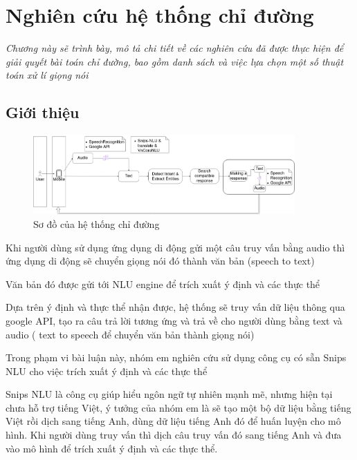 \chapter{Nghiên cứu hệ thống chỉ đường}
\label{Chapter3}

\emph{Chương này sẽ trình bày, mô tả chi tiết về các nghiên cứu đã được thực hiện để giải quyết bài toán chỉ đường, bao gồm danh sách và việc lựa chọn một số thuật toán xử lí giọng nói}

\section{Giới thiệu}
   \begin{figure}[htp]
              \centering
              \includegraphics[width=10cm]{images/Structure-description.png} 
              \caption{Sơ đồ của hệ thống chỉ đường}
              \label{fig:sodohethongchiduong}

          \end{figure}
          
          
Khi người dùng sử dụng ứng dụng di động gửi một câu truy vấn bằng audio thì ứng dụng di động sẽ chuyển giọng nói đó thành văn bản (speech to text)

Văn bản đó được gửi tới NLU engine để trích xuất ý định và các thực thể


Dựa trên ý định và thực thể nhận được, hệ thống sẽ truy vấn dữ liệu thông qua google API, tạo ra câu trả lời tương ứng và trả về cho người dùng bằng text và audio ( text to speech để chuyển văn bản thành giọng nói)



Trong phạm vi bài luận này, nhóm em nghiên cứu sử dụng công cụ có sẵn Snips NLU\cite{Snipsnlu} cho việc trích xuất ý định và các thực thể



Snips NLU là công cụ giúp hiểu ngôn ngữ tự nhiên mạnh mẽ, nhưng hiện tại chưa hỗ trợ tiếng Việt, ý tưởng của nhóm em là sẽ tạo một bộ dữ liệu bằng tiếng Việt rồi dịch sang tiếng Anh, dùng dữ liệu tiếng Anh đó để huấn luyện cho mô hình. Khi người dùng truy vấn thì dịch câu truy vấn đó sang tiếng Anh và đưa vào mô hình để trích xuất ý định và các thực thể.


